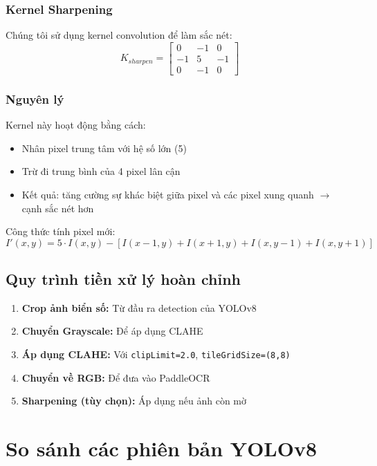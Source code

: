 \subsubsection{Kernel Sharpening}
Chúng tôi sử dụng kernel convolution để làm sắc nét:
\begin{equation}
    K_{sharpen} = \begin{bmatrix}
        0 & -1 & 0 \\
        -1 & 5 & -1 \\
        0 & -1 & 0
    \end{bmatrix}
\end{equation}

\subsubsection{Nguyên lý}
Kernel này hoạt động bằng cách:
\begin{itemize}
    \item Nhân pixel trung tâm với hệ số lớn (5)
    \item Trừ đi trung bình của 4 pixel lân cận
    \item Kết quả: tăng cường sự khác biệt giữa pixel và các pixel xung quanh $\rightarrow$ cạnh sắc nét hơn
\end{itemize}

Công thức tính pixel mới:
\begin{equation}
    I'(x,y) = 5 \cdot I(x,y) - [I(x-1,y) + I(x+1,y) + I(x,y-1) + I(x,y+1)]
\end{equation}

\subsection{Quy trình tiền xử lý hoàn chỉnh}
\begin{enumerate}
    \item \textbf{Crop ảnh biển số:} Từ đầu ra detection của YOLOv8
    \item \textbf{Chuyển Grayscale:} Để áp dụng CLAHE
    \item \textbf{Áp dụng CLAHE:} Với \texttt{clipLimit=2.0}, \texttt{tileGridSize=(8,8)}
    \item \textbf{Chuyển về RGB:} Để đưa vào PaddleOCR
    \item \textbf{Sharpening (tùy chọn):} Áp dụng nếu ảnh còn mờ
\end{enumerate}

\section{So sánh các phiên bản YOLOv8}

